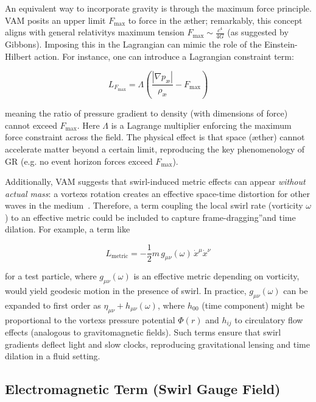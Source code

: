 An equivalent way to incorporate gravity is through the maximum force principle. VAM posits an upper limit $F_{\max}$ to force in the æther; remarkably, this concept aligns with general relativity\rqs s maximum tension $F_{\max} \sim \frac{c^4}{4G}$ (as suggested by Gibbons). Imposing this in the Lagrangian can mimic the role of the Einstein-Hilbert action. For instance, one can introduce a Lagrangian constraint term:

\begin{equation}
    L_{F_{\max}} = \Lambda\left(\frac{|\nabla p_{\text{\ae}}|}{\rho_{\text{\ae}}} - F_{\max}\right)
    \label{eq:max-force-constraint}
\end{equation}

meaning the ratio of pressure gradient to density (with dimensions of force) cannot exceed $F_{\max}$. Here $\Lambda$ is a Lagrange multiplier enforcing the maximum force constraint across the field. The physical effect is that space (æther) cannot accelerate matter beyond a certain limit, reproducing the key phenomenology of GR (e.g. no event horizon forces exceed $F_{\max}$).


Additionally, VAM suggests that swirl-induced metric effects can appear \textit{without actual mass}: a vortex\rqs s rotation creates an effective space-time distortion for other waves in the medium~\cite{VAM3}. Therefore, a term coupling the local swirl rate (vorticity $\omega$) to an effective metric could be included to capture \grqq frame-dragging\textquotedblright and time dilation. For example, a term like

\begin{equation}
    L_{\text{metric}} = -\frac{1}{2}m\, g_{\mu\nu}(\omega) \, \dot{x}^\mu \dot{x}^\nu
    \label{eq:metric-vorticity}
\end{equation}

for a test particle, where $g_{\mu\nu}(\omega)$ is an effective metric depending on vorticity, would yield geodesic motion in the presence of swirl. In practice, $g_{\mu\nu}(\omega)$ can be expanded to first order as $\eta_{\mu\nu} + h_{\mu\nu}(\omega)$, where $h_{00}$ (time component) might be proportional to the vortex\rqs s pressure potential $\Phi(r)$ and $h_{ij}$ to circulatory flow effects (analogous to gravitomagnetic fields). Such terms ensure that swirl gradients deflect light and slow clocks, reproducing gravitational lensing and time dilation in a fluid setting.


\subsection{Electromagnetic Term (Swirl Gauge Field)}

